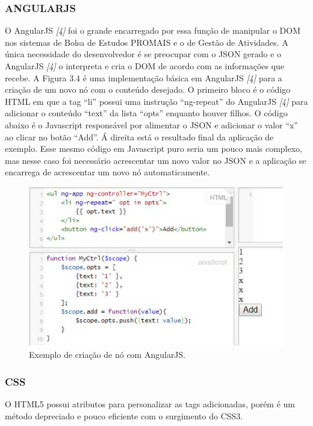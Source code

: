 \documentclass[
  12pt,				%
  openany,
  oneside,
  a4paper,			%
  english,			%
  brazil
]{article}
\numberwithin{figure}{section}
\numberwithin{table}{section}
\begin{document}
\subsubsection{ANGULARJS}

O AngularJS \textit{[4]} foi o grande encarregado por essa função de manipular o DOM nos sistemas de Bolsa de Estudos PROMAIS e o de Gestão de Atividades. A única necessidade do desenvolvedor é se preocupar com o JSON gerado e o AngularJS \textit{[4]} o interpreta e cria o DOM de acordo com as informações que recebe.
A Figura 3.4 é uma implementação básica em AngularJS \textit{[4]} para a criação de um novo nó com o conteúdo desejado. O primeiro bloco é o código HTML em que a tag “li” possui uma instrução “ng-repeat” do AngularJS \textit{[4]} para adicionar o conteúdo “text” da lista “opts” enquanto houver filhos. O código abaixo é o Javascript responsável por alimentar o JSON e adicionar o valor “x” ao clicar no botão “Add”. Á direita está o resultado final da aplicação de exemplo.
Esse mesmo código em Javascript puro seria um pouco mais complexo, mas nesse caso foi necessário acrescentar um novo valor no JSON e a aplicação se encarrega de acrescentar um novo nó automaticamente.

\begin{figure}[!htb]
\centering
\includegraphics[width=1\textwidth]{figura34}
\caption{Exemplo de criação de nó com AngularJS.}
\end{figure}

\subsubsection{CSS}

O HTML5 possui atributos para personalizar as tags adicionadas, porém é um método depreciado e pouco eficiente com o surgimento do CSS3.
\end{document}
